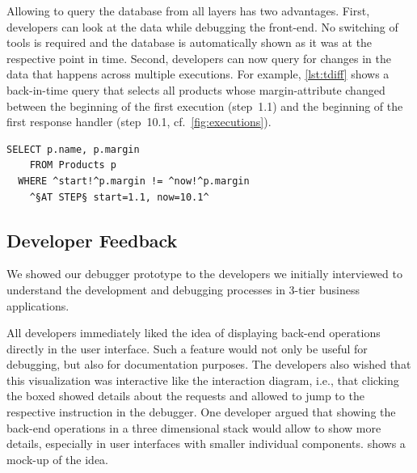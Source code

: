 Allowing to query the database from all layers has two advantages.
First, developers can look at the data while debugging the front-end.
No switching of tools is required and the database is automatically shown as it was at the respective point in time.
Second, developers can now query for changes in the data that happens across multiple executions.
For example, \cref{lst:tdiff} shows a back-in-time query that selects all products whose margin-attribute changed between the beginning of the first execution (step~1.1) and the beginning of the first response handler (step~10.1, cf.~\cref{fig:executions}).

\begin{lstlisting}[language=HanaSQL,float=t,caption={A query selecting all products whose margin was changed during the operation.},label=lst:tdiff,numbers=none]
	SELECT p.name, p.margin
	FROM Products p
  WHERE ^start!^p.margin != ^now!^p.margin
	^§AT STEP§ start=1.1, now=10.1^
\end{lstlisting}


\subsection{Developer Feedback}

We showed our debugger prototype to the developers we initially interviewed to understand the development and debugging processes in 3-tier business applications.

All developers immediately liked the idea of displaying back-end operations directly in the user interface.
Such a feature would not only be useful for debugging, but also for documentation purposes.
The developers also wished that this visualization was interactive like the interaction diagram, i.e., that clicking the boxed showed details about the requests and allowed to jump to the respective instruction in the debugger.
One developer argued that showing the back-end operations in a three dimensional stack would allow to show more details, especially in user interfaces with smaller individual components.
 shows a mock-up of the idea.

